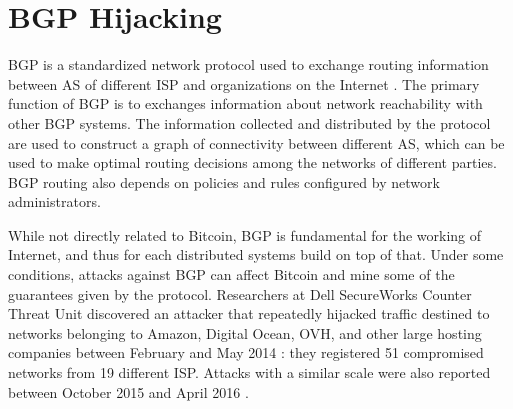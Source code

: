 \section{BGP Hijacking}
\ac{BGP} is a standardized network protocol used to exchange routing information between \ac{AS} \cite{autonomous_systems_wikipedia} of different \ac{ISP} and organizations on the Internet \cite{rfc4271, bgp_wikipedia}.
The primary function of \ac{BGP} is to exchanges information about network reachability with other \ac{BGP} systems.
The information collected and distributed by the protocol are used to construct a graph of connectivity between different \ac{AS}, which can be used to make optimal routing decisions among the networks of different parties.
\ac{BGP} routing also depends on policies and rules configured by network administrators.

\medskip
While not directly related to Bitcoin, \ac{BGP} is fundamental for the working of Internet, and thus for each distributed systems build on top of that.
Under some conditions, attacks against \ac{BGP} can affect Bitcoin and mine some of the guarantees given by the protocol.
Researchers at Dell SecureWorks Counter Threat Unit discovered an attacker that repeatedly hijacked traffic destined to networks belonging to Amazon, Digital Ocean, OVH, and other large hosting companies between February and May 2014 \cite{bgp_hijacking_secureworks}:
they registered \num{51} compromised networks from \num{19} different \ac{ISP}.
Attacks with a similar scale were also reported between October 2015 and April 2016 \cite{hijacking_bitcoin_2017, bgpstream}.

\pagebreak

